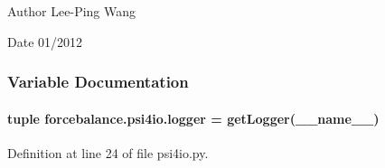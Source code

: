 \begin{DoxyAuthor}{Author}
Lee-\/\-Ping Wang 
\end{DoxyAuthor}
\begin{DoxyDate}{Date}
01/2012 
\end{DoxyDate}


\subsubsection{Variable Documentation}
\hypertarget{namespaceforcebalance_1_1psi4io_a171636f825fb778b0f8ada7e9f978dae}{
\paragraph[{logger}]{\setlength{\rightskip}{0pt plus 5cm}tuple forcebalance.\-psi4io.\-logger = get\-Logger(\-\_\-\-\_\-name\-\_\-\-\_\-)}}\label{namespaceforcebalance_1_1psi4io_a171636f825fb778b0f8ada7e9f978dae}


Definition at line 24 of file psi4io.\-py.

